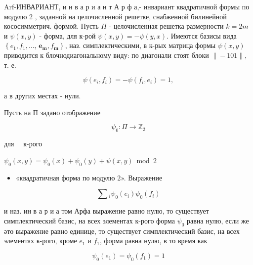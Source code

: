 \documentclass[10pt]{article}
\begin{document}
Arf-ИНВАРИАНТ, и н в а р и а н т А р ф а,- инвариант квадратичной формы по модулю 2 , заданной на целочисленной решетке, снабженной билинейной кососимметрич. формой. Пусть $\Pi$ - целочисленная решетка размерности $k=2 m$ и $\psi(x, y)$ - форма, для к-рой $\psi(x, y)=-\psi(y, x)$. Имеются базисы вида $\left\{e_{1}, f_{1}, \ldots\right.$, $\left.\boldsymbol{e}_{\boldsymbol{m}}, f_{\boldsymbol{m}}\right\}$, наз. симплектическими, в к-рых матрица формы $\psi(x, y)$ приводится к блочнодиагональному виду: по диагонали стоят блоки $\|-101\|$, т. е.



\[

\psi\left(e_{i}, f_{i}\right)=-\psi\left(f_{i}, e_{i}\right)=1,

\]



а в других местах - нули.



Пусть на П задано отображение



\[

\psi_{0}: \Pi \rightarrow \mathbb{Z}_{2}

\]



для $\quad \mathbf{к}$-рого



$\psi_{0}(x, y)=\psi_{0}(x)+\psi_{0}(y)+\psi(x, y) \bmod 2$



\begin{itemize}

  \item «квадратичная форма по модулю 2». Выражение

\end{itemize}



\[

\sum{ }_{i} \psi_{0}\left(e_{i}\right) \psi_{0}\left(f_{i}\right)

\]



и наз. ин в а р и а том Арфа выражение равно нулю, то существует симплектический базис, на всех элементах к-рого форма $\psi_{0}$ равна нулю, если же әто выражение равно единице, то существует симплектический базис, на всех элементах к-рого, кроме $e_{1}$ и $f_{1}$, форма равна нулю, в то время как



\[

\psi_{0}\left(e_{1}\right)=\psi_{0}\left(f_{1}\right)=1

\]
\end{document}
